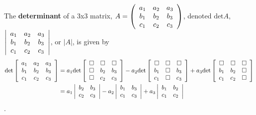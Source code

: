 \documentclass[12pt,letterpaper,noanswers]{exam}
\begin{document}
\begin{tcolorbox}
The \textbf{determinant} of a 3x3 matrix, $A = \left(\begin{array}{c c c} a_1 & a_2 & a_3 \\ b_1 & b_2 & b_3 \\ c_1 & c_2 & c_3 \end{array}\right)$, denoted $\text{det}A$, $\left\vert\begin{array}{c c c} a_1 & a_2 & a_3 \\ b_1 & b_2 & b_3 \\ c_1 & c_2 & c_3 \end{array}\right\vert$, or $\left\vert A\right\vert$, is given by 
\begin{align*}
\text{det}\left[\begin{array}{c c c} a_1 & a_2 & a_3 \\ b_1 & b_2 & b_3 \\ c_1 & c_2 & c_3 \end{array}\right] &= a_1\text{det}\left[\begin{array}{c c c} \square & \square & \square \\ \square & b_2 & b_3 \\ \square & c_2 & c_3 \end{array}\right]-a_2\text{det}\left[\begin{array}{c c c} \square & \square & \square \\ b_1 & \square & b_3 \\ c_1 & \square & c_3 \end{array}\right]+a_3\text{det}\left[\begin{array}{c c c} \square & \square & \square \\ b_1 & b_2 & \square \\ c_1 & c_2 & \square \end{array}\right]
\\  &= a_1\left\vert\begin{array}{c c} b_2 & b_3 \\ c_2 & c_3 \end{array}\right\vert - a_2\left\vert\begin{array}{c c} b_1 & b_3 \\ c_1 & c_3 \end{array}\right\vert  + a_3\left\vert\begin{array}{c c} b_1 & b_2 \\ c_1 & c_2 \end{array}\right\vert 
\end{align*}.


\end{tcolorbox}
\end{document}
